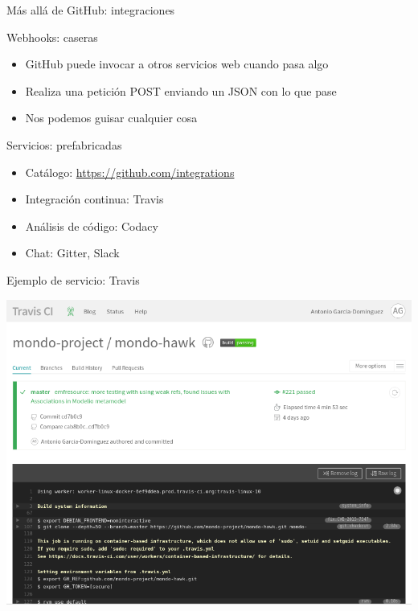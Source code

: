 \documentclass[xcolor=svgnames]{beamer}
\begin{document}
\begin{frame}{Más allá de GitHub: integraciones}
  \begin{block}{Webhooks: caseras}
    \begin{itemize}
    \item GitHub puede invocar a otros servicios web cuando pasa algo
    \item Realiza una petición POST enviando un JSON con lo que pase
    \item Nos podemos guisar cualquier cosa
    \end{itemize}
  \end{block}

  \begin{block}{Servicios: prefabricadas}
    \begin{itemize}
    \item Catálogo: \url{https://github.com/integrations}
    \item Integración continua: Travis
    \item Análisis de código: Codacy
    \item Chat: Gitter, Slack
    \end{itemize}
  \end{block}
\end{frame}

\begin{frame}{Ejemplo de servicio: Travis}
  \begin{center}
    \includegraphics[width=.9\textwidth,height=.8\textheight,keepaspectratio]{travis}
  \end{center}
\end{frame}
\end{document}
